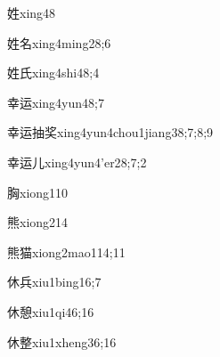 \begin{verbete}{姓}{xing4}{8}
\end{verbete}

\begin{verbete}{姓名}{xing4ming2}{8;6}
\end{verbete}

\begin{verbete}{姓氏}{xing4shi4}{8;4}
\end{verbete}

\begin{verbete}{幸运}{xing4yun4}{8;7}
\end{verbete}

\begin{verbete}{幸运抽奖}{xing4yun4chou1jiang3}{8;7;8;9}
\end{verbete}

\begin{verbete}{幸运儿}{xing4yun4'er2}{8;7;2}
\end{verbete}

\begin{verbete}{胸}{xiong1}{10}
\end{verbete}

\begin{verbete}{熊}{xiong2}{14}
\end{verbete}

\begin{verbete}{熊猫}{xiong2mao1}{14;11}
\end{verbete}

\begin{verbete}{休兵}{xiu1bing1}{6;7}
\end{verbete}

\begin{verbete}{休憩}{xiu1qi4}{6;16}
\end{verbete}

\begin{verbete}{休整}{xiu1xheng3}{6;16}
\end{verbete}

